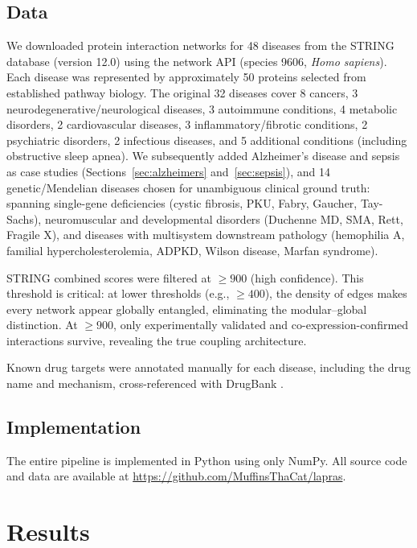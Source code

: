 \documentclass[11pt,a4paper]{article}
\begin{document}
\subsection{Data}

We downloaded protein interaction networks for 48 diseases from the STRING database (version 12.0) \citep{szklarczyk2023} using the network API (species 9606, \textit{Homo sapiens}). Each disease was represented by approximately 50 proteins selected from established pathway biology. The original 32 diseases cover 8 cancers, 3 neurodegenerative/neurological diseases, 3 autoimmune conditions, 4 metabolic disorders, 2 cardiovascular diseases, 3 inflammatory/fibrotic conditions, 2 psychiatric disorders, 2 infectious diseases, and 5 additional conditions (including obstructive sleep apnea). We subsequently added Alzheimer's disease and sepsis as case studies (Sections~\ref{sec:alzheimers} and~\ref{sec:sepsis}), and 14 genetic/Mendelian diseases chosen for unambiguous clinical ground truth: spanning single-gene deficiencies (cystic fibrosis, PKU, Fabry, Gaucher, Tay-Sachs), neuromuscular and developmental disorders (Duchenne MD, SMA, Rett, Fragile X), and diseases with multisystem downstream pathology (hemophilia A, familial hypercholesterolemia, ADPKD, Wilson disease, Marfan syndrome).

STRING combined scores were filtered at $\geq 900$ (high confidence). This threshold is critical: at lower thresholds (e.g., $\geq 400$), the density of edges makes every network appear globally entangled, eliminating the modular--global distinction. At $\geq 900$, only experimentally validated and co-expression-confirmed interactions survive, revealing the true coupling architecture.

Known drug targets were annotated manually for each disease, including the drug name and mechanism, cross-referenced with DrugBank \citep{wishart2018}.

\subsection{Implementation}

The entire pipeline is implemented in Python using only NumPy. All source code and data are available at \url{https://github.com/MuffinsThaCat/lapras}.

\section{Results}
\end{document}
